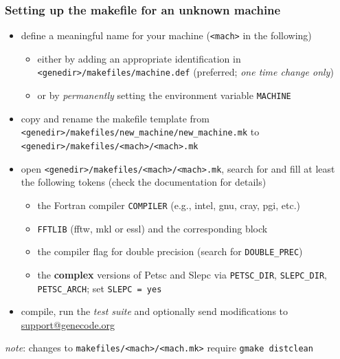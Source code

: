 \documentclass[9pt]{beamer}
\begin{document}


\begin{frame}
  \frametitle{Setting up the makefile for an unknown machine}

\begin{block}{}
 \begin{itemize}
  \item define a meaningful name for your machine ({\tt <mach>} in the following)
\begin{itemize}
 \item either by adding an appropriate identification in {\tt <genedir>/makefiles/machine.def} (preferred; {\em one time change only})
 \item or by {\em permanently} setting the environment variable {\tt MACHINE}
\end{itemize}
 \item copy and rename the makefile template from {\tt \small <genedir>/makefiles/new\_machine/new\_machine.mk} to {\tt \small <genedir>/makefiles/<mach>/<mach>.mk}
 \item open {\tt \small <genedir>/makefiles/<mach>/<mach>.mk}, search for and fill at least the following tokens (check the documentation for details)
\begin{itemize}
\item the Fortran compiler {\tt COMPILER} (e.g., intel, gnu, cray, pgi, etc.)
\item {\tt FFTLIB} (fftw, mkl or essl) and the corresponding block
\item the compiler flag for double precision (search for {\tt DOUBLE\_PREC})
\item the {\bf complex} versions of {\sc Petsc} and {\sc Slepc} via {\tt PETSC\_DIR}, {\tt SLEPC\_DIR}, {\tt PETSC\_ARCH}; set {\tt SLEPC = yes}
\end{itemize}
 \item compile, run the {\em test suite} and optionally send modifications to \href{mailto:support@genecode.org}{support@genecode.org}
 \end{itemize}
\end{block}
\vspace{-1ex}
\begin{alertblock}{}
{\em note}: changes to {\tt \small makefiles/<mach>/<mach.mk>} require {\tt gmake distclean}
\end{alertblock}



\end{frame}
\end{document}

